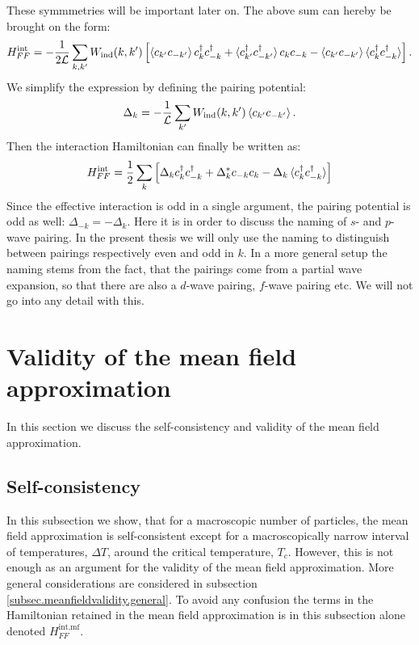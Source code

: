 These symmmetries will be important later on. The above sum can hereby be brought on the form:
\begin{equation}
H^\text{int}_{FF} = -\frac{1}{2\mathcal{L}}\sum_{k,k'} W_{\text{ind}}(k,k')\left[ \braket{ c_{k'}c_{-k'}} c^\dagger_k c^\dagger_{-k} + \braket {c^\dagger_{k'}c^\dagger_{-k'}} c_k c_{-k} - \braket {c_{k'}c_{-k'}} \braket {c^\dagger_{k}c^\dagger_{-k}} \right]. \nonumber
\end{equation}
We simplify the expression by defining the pairing potential:
\begin{equation}
\Delta_k = -\frac{1}{\mathcal{L}}\sum_{k'}W_{\text{ind}}(k,k')\braket {c_{k'}c_{-k'}}.
\label{eq.pairingpotentialdef}
\end{equation}
Then the interaction Hamiltonian can finally be written as:
\begin{equation}
H^\text{int}_{FF} = \frac{1}{2}\sum_{k} \left[ \Delta_k c^\dagger_k c^\dagger_{-k} + \Delta^*_k c_{-k} c_k  - \Delta_k \braket {c^\dagger_{k}c^\dagger_{-k}} \right]
\label{eq.HFFintfinal}
\end{equation}
Since the effective interaction is odd in a single argument, the pairing potential is odd as well: $\Delta_{-k} = -\Delta_k$. Here it is in order to discuss the naming of $s$- and $p$-wave pairing. In the present thesis we will only use the naming to distinguish between pairings respectively even and odd in $k$. In a more general setup the naming stems from the fact, that the pairings come from a partial wave expansion, so that there are also a $d$-wave pairing, $f$-wave pairing etc. We will not go into any detail with this.

\section{Validity of the mean field approximation} \label{sec.meanfieldvalidity}
In this section we discuss the self-consistency and validity of the mean field approximation. 

\subsection{Self-consistency} \label{subsec.meanfieldvalidity.selfconsistency}
In this subsection we show, that for a macroscopic number of particles, the mean field approximation is self-consistent except for a macroscopically narrow interval of temperatures, $\Delta T$, around the critical temperature, $T_c$. However, this is not enough as an argument for the validity of the mean field approximation. More general considerations are considered in subsection \ref{subsec.meanfieldvalidity.general}. To avoid any confusion the terms in the Hamiltonian retained in the mean field approximation is in this subsection alone denoted $H^{\text{int,mf}}_{FF}$. 

